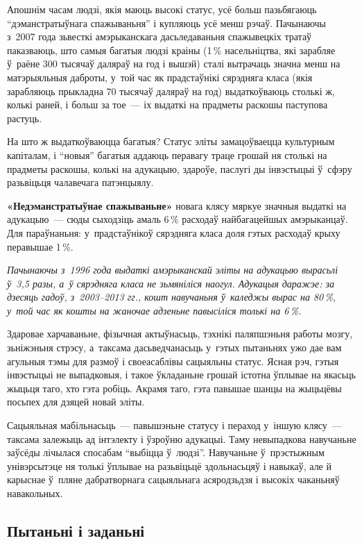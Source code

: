 Апошнім часам людзі, якія маюць высокі статус, усё больш пазьбягаюць ``дэманстратыўнага спажываньня'' і купляюць усё менш рэчаў. Пачынаючы з~2007 года зьвесткі амэрыканскага дасьледаваньня спажывецкіх тратаў паказваюць, што самыя багатыя людзі краіны (1\,\% насельніцтва, які зарабляе ў~раёне 300 тысячаў даляраў на год і вышэй) сталі вытрачаць значна менш на матэрыяльныя даброты, у~той час як прадстаўнікі сярэдняга класа (якія зарабляюць прыкладна 70 тысячаў даляраў на год) выдаткоўваюць столькі ж, колькі раней, і больш за тое~--- іх выдаткі на прадметы раскошы паступова растуць.

На што ж выдаткоўваюцца багатыя? Статус эліты замацоўваецца культурным капіталам, і ``новыя'' багатыя аддаюць перавагу траце грошай ня столькі на прадметы раскошы, колькі на адукацыю, здароўе, паслугі ды інвэстыцыі ў~сфэру разьвіцьця чалавечага патэнцыялу.

\textbf{«Недэманстратыўнае спажываньне»} новага клясу мяркуе значныя выдаткі на адукацыю~--- сюды сыходзіць амаль 6\,\% расходаў найбагацейшых амэрыканцаў. Для параўнаньня: у~прадстаўнікоў сярэдняга класа доля гэтых расходаў крыху перавышае 1\,\%.

\emph{Пачынаючы з~1996 года выдаткі амэрыканскай эліты на адукацыю вырасьлі ў~3,5 разы, а~ў сярэдняга класа не зьмяніліся наогул. Адукацыя даражэе: за дзесяць гадоў, з~2003--2013 гг., кошт навучаньня ў~каледжы вырас на 80\,\%, у~той час як кошты на жаночае адзеньне павысіліся толькі на 6\,\%.}

Здаровае харчаваньне, фізычная актыўнасьць, тэхнікі паляпшэньня работы мозгу, зьніжэньня стрэсу, а~таксама дасьведчанасьць у~гэтых пытаньнях ужо дае вам агульныя тэмы для размоў і своеасаблівы сацыяльны статус. Ясная рэч, гэтыя інвэстыцыі не выпадковыя, і такое ўкладаньне грошай істотна ўплывае на якасьць жыцьця таго, хто гэта робіць. Акрамя таго, гэта павышае шанцы на жыцьцёвы посьпех для дзяцей новай эліты.

Сацыяльная мабільнасьць~--- павышэньне статусу і пераход у~іншую клясу~--- таксама залежыць ад інтэлекту і ўзроўню адукацыі. Таму невыпадкова навучаньне заўсёды лічылася спосабам ``выбіцца ў~людзі''. Навучаньне ў~прэстыжным унівэрсытэце ня толькі ўплывае на разьвіцьцё здольнасьцяў і навыкаў, але й карыснае ў~пляне дабратворнага сацыяльнага асяродзьдзя і высокіх чаканьняў навакольных.

\subsection*{Пытаньні і заданьні}

